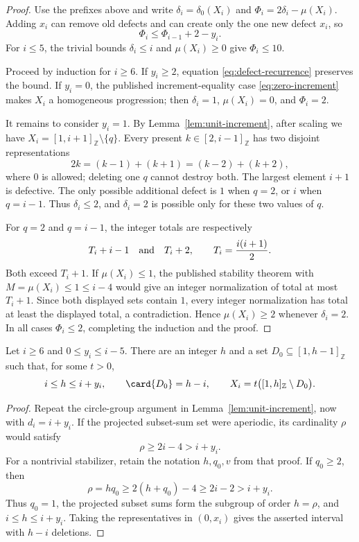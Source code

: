 \begin{proof}
Use the prefixes above and write $\delta_i=\delta_0(X_i)$ and
$\Phi_i=2\delta_i-\mu(X_i)$.  Adding $x_i$ can remove old defects and can
create only the one new defect $x_i$, so
\begin{equation}
 \Phi_i\leq\Phi_{i-1}+2-y_i.
 \label{eq:defect-recurrence}
\end{equation}
For $i\leq5$, the trivial bounds $\delta_i\leq i$ and $\mu(X_i)\geq0$
give $\Phi_i\leq10$.

Proceed by induction for $i\geq6$.  If $y_i\geq2$, equation
\eqref{eq:defect-recurrence} preserves the bound.  If $y_i=0$, the published
increment-equality case \eqref{eq:zero-increment} makes $X_i$ a homogeneous
progression; then $\delta_i=1$, $\mu(X_i)=0$, and $\Phi_i=2$.

It remains to consider $y_i=1$.  By Lemma~\ref{lem:unit-increment}, after
scaling we have $X_i=[1,i+1]_{\mathbb Z}\setminus\{q\}$.  Every present
$k\in[2,i-1]_{\mathbb Z}$ has two disjoint representations
\[
 2k=(k-1)+(k+1)=(k-2)+(k+2),
\]
where $0$ is allowed; deleting one $q$ cannot destroy both.  The largest
element $i+1$ is defective.  The only possible additional defect is $1$
when $q=2$, or $i$ when $q=i-1$.  Thus $\delta_i\leq2$, and
$\delta_i=2$ is possible only for these two values of $q$.

For $q=2$ and $q=i-1$, the integer totals are respectively
\[
 T_i+i-1\quad\hbox{and}\quad T_i+2,
 \qquad T_i=\frac{i(i+1)}2.
\]
Both exceed $T_i+1$.  If $\mu(X_i)\leq1$, the published stability theorem
with $M=\mu(X_i)\leq1\leq i-4$ would give an integer normalization of total
at most $T_i+1$.  Since both displayed sets contain $1$, every integer
normalization has total at least the displayed total, a contradiction.
Hence $\mu(X_i)\geq2$ whenever $\delta_i=2$.  In all cases
$\Phi_i\leq2$, completing the induction and the proof.
\end{proof}

\begin{lemma}\label{lem:small-increment}
Let $i\geq6$ and $0\leq y_i\leq i-5$.  There are an integer $h$ and a set
$D_0\subseteq[1,h-1]_{\mathbb Z}$ such that, for some $t>0$,
\[
 i\leq h\leq i+y_i,\qquad \card{D_0}=h-i,\qquad
 X_i=t\bigl([1,h]_{\mathbb Z}\setminus D_0\bigr).
\]
\end{lemma}

\begin{proof}
Repeat the circle-group argument in Lemma~\ref{lem:unit-increment}, now with
$d_i=i+y_i$.  If the projected subset-sum set were aperiodic, its cardinality
$\rho$ would satisfy
\[
 \rho\geq2i-4>i+y_i.
\]
For a nontrivial stabilizer, retain the notation $h,q_0,v$ from that proof.
If $q_0\geq2$, then
\[
 \rho=hq_0\geq2(h+q_0)-4\geq2i-2>i+y_i.
\]
Thus $q_0=1$, the projected subset sums form the subgroup of order
$h=\rho$, and $i\leq h\leq i+y_i$.  Taking the representatives in $(0,x_i)$
gives the asserted interval with $h-i$ deletions.
\end{proof}

